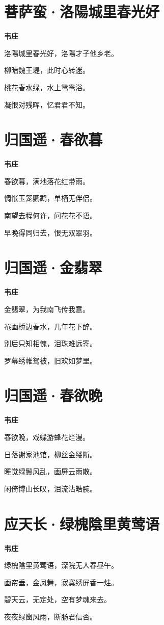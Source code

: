 \documentclass[12pt,a4paper]{ctexbook}
\begin{document}
\section{菩萨蛮·洛陽城里春光好}
\textbf{韦庄}\par\vspace{0.5em}
洛陽城里春光好，洛陽才子他乡老。\par
柳暗魏王堤，此时心转迷。\par
桃花春水绿，水上鸳鸯浴。\par
凝恨对残晖，忆君君不知。\par

\section{归国遥·春欲暮}
\textbf{韦庄}\par\vspace{0.5em}
春欲暮，满地落花红带雨。\par
惆怅玉笼鹦鹉，单栖无伴侣。\par
南望去程何许，问花花不语。\par
早晚得同归去，恨无双翠羽。\par

\section{归国遥·金翡翠}
\textbf{韦庄}\par\vspace{0.5em}
金翡翠，为我南飞传我意。\par
罨画桥边春水，几年花下醉。\par
别后只知相愧，泪珠难远寄。\par
罗幕绣帷鸳被，旧欢如梦里。\par

\section{归国遥·春欲晚}
\textbf{韦庄}\par\vspace{0.5em}
春欲晚，戏蝶游蜂花烂漫。\par
日落谢家池馆，柳丝金缕断。\par
睡觉绿鬟风乱，画屏云雨散。\par
闲倚博山长叹，泪流沾皓腕。\par

\section{应天长·绿槐陰里黄莺语}
\textbf{韦庄}\par\vspace{0.5em}
绿槐陰里黄莺语，深院无人春昼午。\par
画帘垂，金凤舞，寂寞绣屏香一炷。\par
碧天云，无定处，空有梦魂来去。\par
夜夜绿窗风雨，断肠君信否。\par
\end{document}
